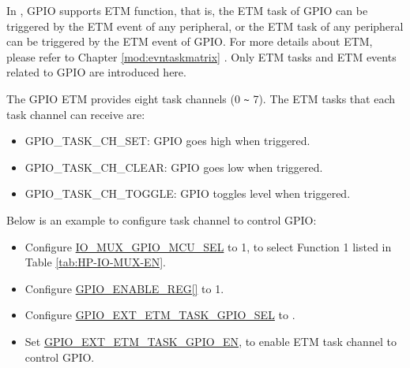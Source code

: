 \documentclass[main\_\_EN.tex]{subfiles}
\begin{document}
In \chipname{}, GPIO supports ETM function, that is, the ETM task of GPIO can be triggered by the ETM event of any peripheral, or the ETM task of any peripheral can be triggered by the ETM event of GPIO. For more details about ETM, please refer to Chapter \ref{mod:evntaskmatrix} \textit{}. Only ETM tasks and ETM events related to GPIO are introduced here.

The GPIO ETM provides eight task channels  (0 \verb+~+ 7). The ETM tasks that each task channel can receive are:

\begin{itemize}
    \item GPIO\_TASK\_CH\_SET: GPIO goes high when triggered.
    \item GPIO\_TASK\_CH\_CLEAR: GPIO goes low when triggered.
    \item GPIO\_TASK\_CH\_TOGGLE: GPIO toggles level when triggered.
\end{itemize}

Below is an example to configure task channel   to control GPIO:

\begin{itemize}
    \item Configure \hyperref[fielddesc:IOMUXGPIONMCUSEL]{IO\_MUX\_GPIO\_MCU\_SEL} to 1, to select Function 1 listed in Table \ref{tab:HP-IO-MUX-EN}.
    \item Configure \hyperref[regdesc:GPIOENABLEREG]{GPIO\_ENABLE\_REG[]} to 1.
    \item Configure \hyperref[fielddesc:GPIOSDETMTASKGPIO0SEL]{GPIO\_EXT\_ETM\_TASK\_GPIO\_SEL} to .
    \item Set \hyperref[fielddesc:GPIOSDETMTASKGPIO0EN]{GPIO\_EXT\_ETM\_TASK\_GPIO\_EN}, to enable ETM task channel  to control GPIO.
\end{itemize}
\end{document}
